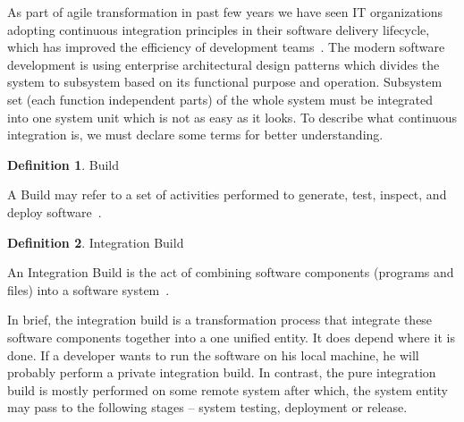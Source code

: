 \documentclass[12pt,a4paper]{article}
\theoremstyle{definition}
\newtheorem{definition}{Definition}[section]
\begin{document}
        As part of agile transformation in past few years we have seen IT organizations adopting continuous integration principles in their software delivery lifecycle, which has improved the efficiency of development teams~\cite{7173368}. The modern software development is using enterprise architectural design patterns which divides the system to subsystem based on its functional purpose and operation. Subsystem set (each function independent parts) of the whole system must be integrated into one system unit which is not as easy as it looks. To describe what continuous integration is, we must declare some terms for better understanding.

        \begin{definition}
            Build\\[-5mm]
            \begin{center}
                \begin{minipage}{0.9\textwidth}
                    A Build may refer to a set of activities performed to generate, test, inspect, and deploy software~\cite{ci1}.\\[-2.5mm]
                \end{minipage}
            \end{center}
        \end{definition}

        \begin{definition}
            Integration Build\\[-5mm]
            \begin{center}
                \begin{minipage}{0.9\textwidth}
                    An Integration Build is the act of combining software components (programs and files) into a software system~\cite{ci1}.\\[-2.5mm]
                \end{minipage}
            \end{center}
        \end{definition}

        In brief, the integration build is a transformation process that integrate these software components together into a one unified entity. It does depend where it is done. If a developer wants to run the software on his local machine, he will probably perform a private integration build. In contrast, the pure integration build is mostly performed on some remote system after which, the system entity may pass to the following stages -- system testing, deployment or release.
\end{document}
